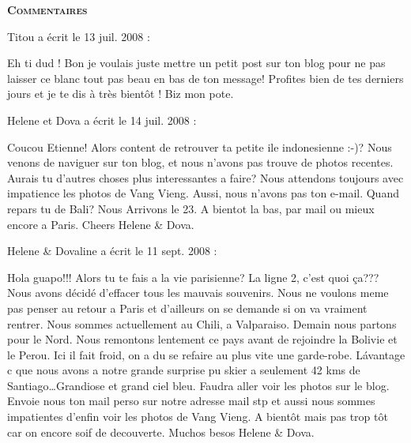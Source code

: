 \bigskip
\textbf{\textsc{Commentaires}}

\medskip
Titou a écrit le 13 juil. 2008 :
\begin{displayquote}
Eh ti dud !
Bon je voulais juste mettre un petit post sur ton blog pour ne pas laisser ce blanc tout pas beau en bas de ton message! Profites bien de tes derniers jours et je te dis à très bientôt !
Biz mon pote.
\end{displayquote}

\medskip
Helene et Dova a écrit le 14 juil. 2008 :
\begin{displayquote}
Coucou Etienne!
Alors content de retrouver ta petite ile indonesienne :-)?
Nous venons de naviguer sur ton blog, et nous n'avons pas trouve de photos recentes. Aurais tu d'autres choses plus interessantes a faire?
Nous attendons toujours avec impatience les photos de Vang Vieng.
Aussi, nous n'avons pas ton e-mail.
Quand repars tu de Bali? Nous Arrivons le 23.
A bientot la bas, par mail ou mieux encore a Paris.
Cheers Helene \& Dova.
\end{displayquote}

\medskip
Helene \& Dovaline a écrit le 11 sept. 2008 :
\begin{displayquote}
Hola guapo!!!
Alors tu te fais a la vie parisienne? La ligne 2, c'est quoi ça??? Nous avons décidé d'effacer tous les mauvais souvenirs. Nous ne voulons meme pas penser au retour a Paris et d'ailleurs on se demande si on va vraiment rentrer.
Nous sommes actuellement au Chili, a Valparaiso. Demain nous partons pour le Nord. Nous remontons lentement ce pays avant de rejoindre la Bolivie et le Perou. Ici il fait froid, on a du se refaire au plus vite une garde-robe. Lávantage c que nous avons a notre grande surprise pu skier a seulement 42 kms de Santiago\dots Grandiose et grand ciel bleu. Faudra aller voir les photos sur le blog.
Envoie nous ton mail perso sur notre adresse mail stp et aussi nous sommes impatientes d'enfin voir les photos de Vang Vieng.
A bientôt mais pas trop tôt car on encore soif de decouverte.
Muchos besos
Helene \& Dova.
\end{displayquote}

\vfill

